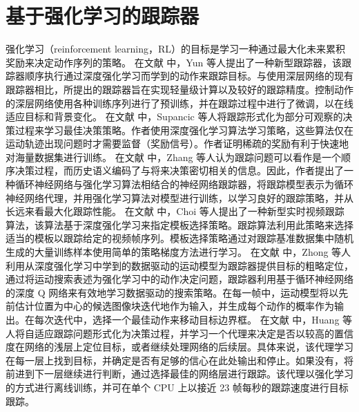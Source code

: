 \section{基于强化学习的跟踪器}
强化学习（reinforcement learning，RL）的目标是学习一种通过最大化未来累积奖励来决定动作序列的策略。
在文献 \cite{yun2017action} 中，Yun 等人提出了一种新型跟踪器，该跟踪器顺序执行通过深度强化学习而学到的动作来跟踪目标。与使用深层网络的现有跟踪器相比，所提出的跟踪器旨在实现轻量级计算以及较好的跟踪精度。控制动作的深层网络使用各种训练序列进行了预训练，并在跟踪过程中进行了微调，以在线适应目标和背景变化。 %
在文献 \cite{supancic2017tracking} 中，Supancic 等人将跟踪形式化为部分可观察的决策过程来学习最佳决策策略。作者使用深度强化学习算法学习策略，这些算法仅在运动轨迹出现问题时才需要监督（奖励信号）。作者证明稀疏的奖励有利于快速地对海量数据集进行训练。 %
在文献 \cite{DeepReinforcement} 中，Zhang 等人认为跟踪问题可以看作是一个顺序决策过程，而历史语义编码了与将来决策密切相关的信息。因此，作者提出了一种循环神经网络与强化学习算法相结合的神经网络跟踪器，将跟踪模型表示为循环神经网络代理，并用强化学习算法对模型进行训练，以学习良好的跟踪策略，并从长远来看最大化跟踪性能。%
在文献 \cite{RealTimeVisual} 中，Choi 等人提出了一种新型实时视频跟踪算法，该算法基于深度强化学习来指定模板选择策略。跟踪算法利用此策略来选择适当的模板以跟踪给定的视频帧序列。模板选择策略通过对跟踪基准数据集中随机生成的大量训练样本使用简单的策略梯度方法进行学习。%
在文献 \cite{HierarchicalTracking} 中，Zhong 等人利用从深度强化学习中学到的数据驱动的运动模型为跟踪器提供目标的粗略定位，通过将运动搜索表述为强化学习中的动作决定问题，跟踪器利用基于循环神经网络的深度 Q 网络来有效地学习数据驱动的搜索策略。在每一帧中，运动模型将以先前估计位置为中心的候选图像块迭代地作为输入，并生成每个动作的概率作为输出。在每次迭代中，选择一个最佳动作来移动目标边界框。%
在文献 \cite{LearningPolicies} 中，Huang 等人将自适应跟踪问题形式化为决策过程，并学习一个代理来决定是否以较高的置信度在网络的浅层上定位目标，或者继续处理网络的后续层。具体来说，该代理学习在每一层上找到目标，并确定是否有足够的信心在此处输出和停止。如果没有，将前进到下一层继续进行判断，通过选择最佳的网络层进行跟踪。该代理以强化学习的方式进行离线训练，并可在单个 CPU 上以接近 23 帧每秒的跟踪速度进行目标跟踪。%
